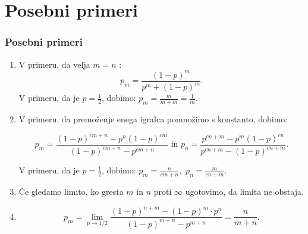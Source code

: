 \documentclass[10pt]{beamer}
\begin{document}
\section[Posebni primeri]{Posebni primeri}
\begin{frame}
\frametitle{Posebni primeri}
\begin{enumerate}
\item V primeru, da velja $m = n$ : $$p_m = \frac{(1-p)^m}{p^m+(1-p)^m}.$$
V primeru, da je $p = \frac{1}{2}$, dobimo: 
$p_m = \frac{m}{m + m} = \frac{1}{m}.$
\item V primeru, da premoženje enega igralca pomnožimo s konstanto, dobimo:

$$p_m = \frac{(1-p)^{c m+n}-p^n (1-p)^{c m}}{(1-p)^{c m+n}-p^{c m+n}} \textrm{ in }
p_n = \frac{p^{c n+m}-p^m (1-p)^{c n}}{p^{c n+m}-(1-p)^{c n+m}}.$$

V primeru, da je $p = \frac{1}{2}$, dobimo: 
$p_m = \frac{n}{cm + n},$ $p_n = \frac{m}{cn + m}.$
\item Če gledamo limito, ko gresta $m$ in $n$ proti $\infty$ ugotovimo, da limita ne obstaja.
\item $$p_m = \lim_{p \to 1/2}  \frac{(1-p)^{n+m} - (1-p)^m \cdot p^n}{(1-p)^{m+n} - p^{m+n}}  =\frac{n}{m + n}.$$
\end{enumerate}
\end{frame}
\end{document}
